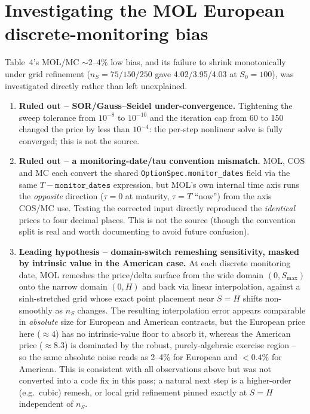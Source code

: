 \documentclass[11pt]{article}
\begin{document}
\section{Investigating the MOL European discrete-monitoring bias}

Table~4's MOL/MC $\sim$2--4\% low bias, and its failure to shrink
monotonically under grid refinement ($n_S{=}75/150/250$ gave 4.02/3.95/4.03 at
$S_0{=}100$), was investigated directly rather than left unexplained.

\begin{enumerate}
\item \textbf{Ruled out -- SOR/Gauss--Seidel under-convergence.} Tightening
the sweep tolerance from $10^{-8}$ to $10^{-10}$ and the iteration cap from 60
to 150 changed the price by less than $10^{-4}$: the per-step nonlinear solve
is fully converged; this is not the source.
\item \textbf{Ruled out -- a monitoring-date/tau convention mismatch.} MOL,
COS and MC each convert the shared \texttt{OptionSpec.monitor\_dates} field
via the same $T - \texttt{monitor\_dates}$ expression, but MOL's own internal
time axis runs the \emph{opposite} direction ($\tau{=}0$ at maturity, $\tau{=}T$
``now'') from the axis COS/MC use. Testing the corrected input directly
reproduced the \emph{identical} prices to four decimal places. This is not
the source (though the convention split is real and worth documenting to
avoid future confusion).
\item \textbf{Leading hypothesis -- domain-switch remeshing sensitivity,
masked by intrinsic value in the American case.} At each discrete monitoring
date, MOL remeshes the price/delta surface from the wide domain $(0,S_{\max})$
onto the narrow domain $(0,H)$ and back via linear interpolation, against a
sinh-stretched grid whose exact point placement near $S{=}H$ shifts
non-smoothly as $n_S$ changes. The resulting interpolation error appears
comparable in \emph{absolute} size for European and American contracts, but
the European price here ($\approx 4$) has no intrinsic-value floor to absorb
it, whereas the American price ($\approx 8.3$) is dominated by the robust,
purely-algebraic exercise region -- so the same absolute noise reads as
2--4\% for European and $<0.4\%$ for American. This is consistent with all
observations above but was not converted into a code fix in this pass; a
natural next step is a higher-order (e.g.\ cubic) remesh, or local grid
refinement pinned exactly at $S{=}H$ independent of $n_S$.
\end{enumerate}
\end{document}
